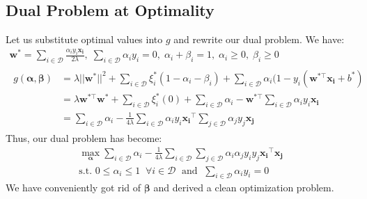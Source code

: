 \documentclass[12pt]{article}
\begin{document}
\subsection{Dual Problem at Optimality}
Let us substitute optimal values into $g$ and rewrite our dual problem. We have:
\begin{gather*}
    \boldsymbol{w^*}=\sum_{i \in \mathcal{D}}\frac{\alpha_iy_i\boldsymbol{x_i}}{2\lambda},\; \sum_{i \in \mathcal{D}}\alpha_iy_i=0 ,\; \alpha_i+\beta_i=1, \;\alpha_i \geq 0,\; \beta_i \geq 0  \\
    \begin{aligned}
    g(\boldsymbol{\alpha,\beta})&=\lambda || \boldsymbol{w^*} ||^2 + \sum_{i \in \mathcal{D}} \xi_i^*(1-\alpha_i-\beta_i) + \sum_{i \in \mathcal{D}} \alpha_i(1-y_i(\boldsymbol{w}^{*\top}\boldsymbol{x_i}+b^*) \\
    &=\lambda \boldsymbol{w}^{*\top} \boldsymbol{w}^{*} + \sum_{i \in \mathcal{D}}\xi_i^*(0) +\sum_{i \in \mathcal{D}}\alpha_i - \boldsymbol{w}^{*\top}\sum_{i \in \mathcal{D}}\alpha_iy_i\boldsymbol{x_i} \\
    &=\sum_{i \in \mathcal{D}}\alpha_i - \frac{1}{4\lambda}\sum_{i \in \mathcal{D}}\alpha_iy_i\boldsymbol{x_i}^\top\sum_{j \in \mathcal{D}}\alpha_jy_j\boldsymbol{x_j}           
    \end{aligned}
\end{gather*}
Thus, our dual problem has become: 
\begin{gather*}
    \max_{\boldsymbol{\alpha}}\sum_{i \in \mathcal{D}}\alpha_i - \frac{1}{4\lambda}\sum_{i \in \mathcal{D}}\sum_{j \in \mathcal{D}}\alpha_i\alpha_jy_iy_j\boldsymbol{x_i}^\top\boldsymbol{x_j} \\
    \text{s.t. } 0 \leq \alpha_i \leq 1 \; \; \forall i \in \mathcal{D} \; \text{ and } \; \sum_{i \in \mathcal{D}}\alpha_iy_i=0 
\end{gather*}
We have conveniently got rid of $\boldsymbol{\beta}$ and derived a clean optimization problem.
\end{document}
